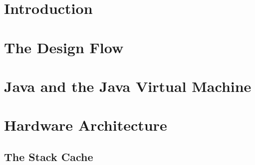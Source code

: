 


%




\frontmatter \pagestyle{empty}



\pagestyle{scrheadings}

\tableofcontents \cleardoublepage

\mainmatter


\chapter{Introduction}
\label{chap:intro}
    

\chapter{The Design Flow}
\label{chap:build}




\chapter{Java and the Java Virtual Machine}
\label{chap:java}


%
%    

\chapter{Hardware Architecture}
\label{chap:arch}

    

\clearpage
    \section{The Stack Cache}
    \label{sec:stack}
    

